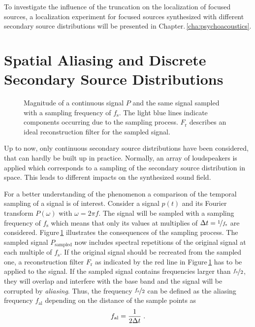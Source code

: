 To investigate the influence of the truncation on the localization of
focused sources, a localization experiment for focused sources synthesized with
different secondary source distributions will be presented in
Chapter.\,\ref{cha:psychoacoustics}.


\section[Spatial Aliasing and Discretization]{Spatial Aliasing and Discrete Secondary Source Distributions}
\label{sec:spatial_aliasing_and_discrete_secondary_source_distributions}

%
\begin{figure}
    \small
    
    \caption{Magnitude of a continuous signal $P$ and the same signal
    sampled with a sampling frequency of $f_\text{s}$. The light blue lines
    indicate components occurring due to the sampling process. $F_\text{r}$
    describes an ideal reconstruction filter for the sampled signal.
    }
    \label{fig:sampling}
\end{figure}
%
\noindent Up to now, only continuous secondary source distributions have been
considered, that can hardly be built up in practice. Normally, an array of
loudspeakers is applied which corresponds to a sampling of the secondary source
distribution in space. This leads to different impacts on the synthesized sound
field.

For a better understanding of the phenomenon a comparison of the temporal
sampling of a signal is of interest. Consider a signal $p(t)$ and its Fourier
transform $P(\omega)$ with $\omega = 2\pi f$. The signal will be sampled with a
sampling frequency of $f_\text{s}$ which means that only its values at multiplies of
$\Delta t = \nicefrac{1}{f_\text{s}}$ are considered. Figure\,\ref{fig:sampling}
illustrates the consequences of the sampling process. The sampled signal
$P_\text{sampled}$ now includes spectral repetitions of the original signal at
each multiple
of $f_\text{s}$. If the original signal should be recreated from the sampled
one, a reconstruction filter $F_\text{r}$ as indicated by the red line in
Figure\,\ref{fig:sampling} has to be applied to the signal.
If the sampled signal contains frequencies larger than
$\nicefrac{f_\text{s}}{2}$, they will overlap and interfere with the base band
and the signal will be corrupted by \emph{aliasing}.
Thus, the frequency $\nicefrac{f_\text{s}}{2}$
can be defined as the aliasing frequency $f_\text{al}$ depending on the
distance of the sample points as
%
\begin{equation}
    f_\text{al} = \frac{1}{2\Delta t} \qp
    \label{eq:fal_time}
\end{equation}
%


